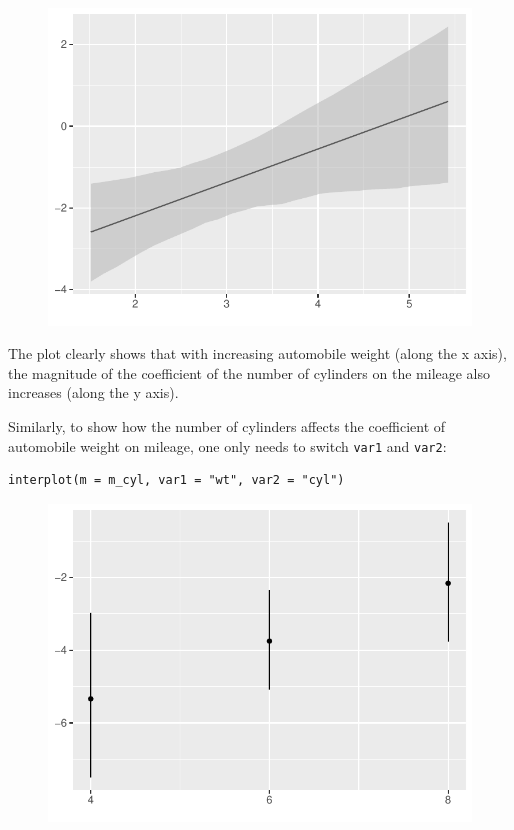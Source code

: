 \documentclass[
  article]{jss}
\begin{document}
\begin{figure}[H]

{\centering \includegraphics{jss_manuscript_files/figure-pdf/unnamed-chunk-3-1.pdf}

}

\end{figure}

The plot clearly shows that with increasing automobile weight (along the
x axis), the magnitude of the coefficient of the number of cylinders on
the mileage also increases (along the y axis).

Similarly, to show how the number of cylinders affects the coefficient
of automobile weight on mileage, one only needs to switch \texttt{var1}
and \texttt{var2}:

\begin{verbatim}
interplot(m = m_cyl, var1 = "wt", var2 = "cyl")
\end{verbatim}

\begin{figure}[H]

{\centering \includegraphics{jss_manuscript_files/figure-pdf/unnamed-chunk-4-1.pdf}

}

\end{figure}
\end{document}
